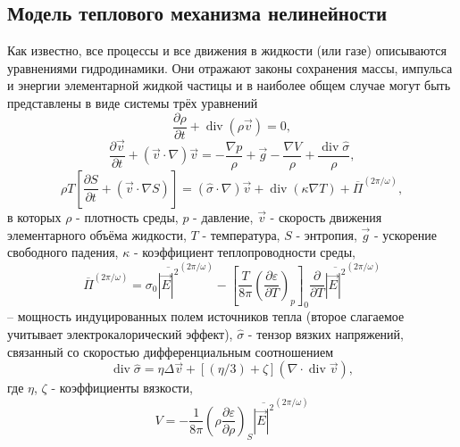 \subsection{Модель теплового механизма нелинейности}
Как известно, все процессы и все движения в жидкости (или газе) описываются уравнениями гидродинамики. Они отражают законы сохранения массы, импульса и энергии элементарной жидкой частицы и в наиболее общем случае могут быть представлены в виде системы трёх уравнений
\begin{equation}
	\label{eq:pdv.5}
	\frac{\partial \rho}{\partial t}+\operatorname{div}(\rho \vec{v})=0,
\end{equation}
\begin{equation}
	\label{eq:pdv.6}
	\frac{\partial \vec{v}}{\partial t}+(\vec{v} \cdot \nabla) \vec{v}=-\frac{\nabla p}{\rho}+\vec{g}-\frac{\nabla V}{\rho}+\frac{\operatorname{div} \hat{\sigma}}{\rho},
\end{equation}
\begin{equation}
	\label{eq:pdv.7}
	\rho T\left[\frac{\partial S}{\partial t}+(\vec{v} \cdot \nabla S)\right]=(\hat{\sigma} \cdot \nabla) \vec{v}+\operatorname{div}(\kappa \nabla T)+\overline{\Pi}^{(2 \pi / \omega)},
\end{equation}
в которых $\rho$ - плотность среды, $p$ - давление, $\vec{v}$ - скорость движения элементарного объёма жидкости, $T$ - температура, $S$ - энтропия, $\vec{g}$ - ускорение свободного падения, $\kappa$ - коэффициент теплопроводности среды,
\begin{equation}
	\label{eq:pdv.8}
	\overline{\Pi}^{(2 \pi / \omega)}=\sigma_{0} \overline{|\vec{E}|^{2}}^{(2 \pi / \omega)}-\left[\frac{T}{8 \pi}\left(\frac{\partial \varepsilon}{\partial T}\right)_{p}\right]_{0} \frac{\partial}{\partial T} \overline{|\vec{E}|^{2}}^{(2 \pi / \omega)}
\end{equation}
-- мощность индуцированных полем источников тепла (второе слагаемое учитывает электрокалорический эффект), $\hat{\sigma}$ - тензор вязких напряжений, связанный со скоростью дифференциальным соотношением
\begin{equation}
	\label{eq:pdv.9}
	\operatorname{div} \hat{\sigma}=\eta \Delta \vec{v}+[(\eta / 3)+\zeta](\nabla \cdot \operatorname{div} \vec{v}),
\end{equation}
где $\eta$, $\zeta$ - коэффициенты вязкости,
\begin{equation}
	\label{eq:pdv.10}
	V=-\frac{1}{8 \pi}\left(\rho \frac{\partial \varepsilon}{\partial \rho}\right)_{S} \overline{|\vec{E}|^{2}}^{(2 \pi / \omega)}
\end{equation}
